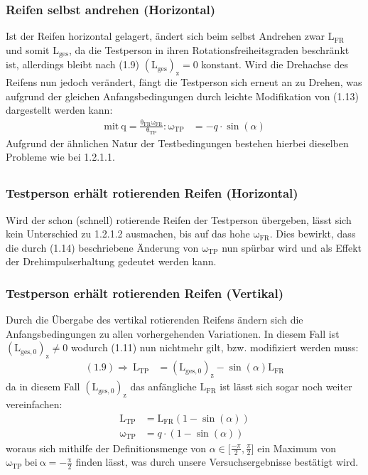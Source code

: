 \documentclass{include/protokollclass}
\begin{document}
    \subsubsection{Reifen selbst andrehen (Horizontal)}
    Ist der Reifen horizontal gelagert, ändert sich beim selbst Andrehen zwar $\mathrm{L_{FR}}$ und somit $\mathrm{L_{ges}}$, da die Testperson in ihren Rotationsfreiheitsgraden beschränkt ist, allerdings bleibt nach (1.9) $\mathrm{(L_{ges})_z}=0$ konstant. Wird die Drehachse des Reifens nun jedoch verändert, fängt die Testperson sich erneut an zu Drehen, was aufgrund der gleichen Anfangsbedingungen durch leichte Modifikation von (1.13) dargestellt werden kann:
    \begin{align}
        \mathrm{mit\ q=\frac{\theta_{FR}\omega_{FR}}{\theta_{TP}}}: \mathrm{\omega_{TP}} &= -q\cdot \sin(\alpha)
    \end{align}
    Aufgrund der ähnlichen Natur der Testbedingungen bestehen hierbei dieselben Probleme wie bei 1.2.1.1.
    
    \subsection{}
    \subsubsection{Testperson erhält rotierenden Reifen (Horizontal)}
    Wird der schon (schnell) rotierende Reifen der Testperson übergeben, lässt sich kein Unterschied zu 1.2.1.2 ausmachen, bis auf das hohe $\mathrm{\omega_{FR}}$. Dies bewirkt, dass die durch (1.14) beschriebene Änderung von $\mathrm{\omega_{TP}}$ nun spürbar wird und als Effekt der Drehimpulserhaltung gedeutet werden kann.
    \subsubsection{Testperson erhält rotierenden Reifen (Vertikal)}
    Durch die Übergabe des vertikal rotierenden Reifens ändern sich die Anfangsbedingungen zu allen vorhergehenden Variationen. In diesem Fall ist $\mathrm{(L_{ges,0})_z}\not=0$ wodurch (1.11) nun nichtmehr gilt, bzw. modifiziert werden muss:
    \begin{align}
        \mathrm{(1.9)}\Rightarrow\ \mathrm{L_{TP}} &= \mathrm{(L_{ges,0})_z}-\sin(\alpha)\mathrm{L_{FR}}
    \end{align}
    da in diesem Fall $\mathrm{(L_{ges,0})_z}$ das anfängliche $\mathrm{L_{FR}}$ ist lässt sich sogar noch weiter vereinfachen:
    \begin{align}
        \mathrm{L_{TP}} &= \mathrm{L_{FR}}(1-\sin(\alpha)) \\
        \mathrm{\omega_{TP}} &= q \cdot (1-\sin(\alpha))
    \end{align}
    woraus sich mithilfe der Definitionsmenge von $\alpha \in [\frac{-\pi}{2},\frac{\pi}{2}$] ein Maximum von $\mathrm{\omega_{TP}\ bei\ \alpha=-\frac{\pi}{2}}$ finden lässt, was durch unsere Versuchsergebnisse bestätigt wird.
\end{document}
